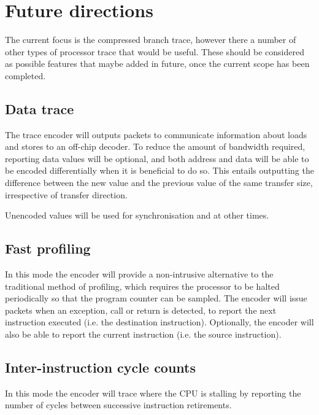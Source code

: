 \chapter{Future directions} \label{Future}

The current focus is the compressed branch trace, however there a
number of other types of processor trace that would be useful. These
should be considered as possible features that maybe added in future,
once the current scope has been completed.

\section{Data trace}

The trace encoder will outputs packets to communicate information
about loads and stores to an off-chip decoder.  To reduce the amount
of bandwidth required, reporting data values will be optional, and
both address and data will be able to be encoded differentially when
it is beneficial to do so.  This entails outputting the difference
between the new value and the previous value of the same transfer
size, irrespective of transfer direction.

Unencoded values will be used for synchronisation and at other times.

\section {Fast profiling}

In this mode the encoder will provide a non-intrusive alternative to
the traditional method of profiling, which requires the processor to
be halted periodically so that the program counter can be sampled.
The encoder will issue packets when an exception, call or return is
detected, to report the next instruction executed (i.e. the
destination instruction).  Optionally, the encoder will also be able to
report the current instruction (i.e. the source instruction).

\section {Inter-instruction cycle counts}

In this mode the encoder will trace where the CPU is stalling by
reporting the number of cycles between successive instruction
retirements.
